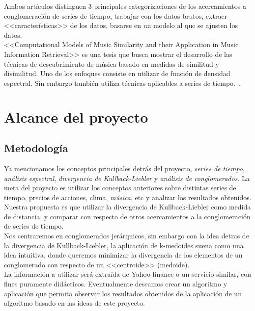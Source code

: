 \documentclass[12pt,oneside]{book}
\begin{document}
Ambos art\'iculos distinguen 3 principales categorizaciones de los acercamientos a conglomeraci\'on de series de tiempo, trabajar con los datos brutos, extraer <<caracter\'isticas>> de los datos, basarse en un modelo al que se ajusten los datos. \\

<<Computational Models of Music Similarity and their Application in Music Information Retrieval>> es una tesis que busca mostrar el desarrollo de las t\'ecnicas de descubrimiento de m\'usica basado en medidas de similitud y disimilitud. Uno de los enfoques consiste en utilizar de funci\'on de densidad espectral. Sin embargo tambi\'en utiliza t\'ecnicas aplicables a series de tiempo.~\cite{MUSIC}.
\chapter{Alcance del proyecto} %
\label{cha:alcance_del_proyecto}
\section{Metodolog\'ia} %
\label{sec:metodologia}
Ya mencionamos los conceptos principales detr\'as del proyecto, \emph{series de tiempo}, \emph{an\'alisis espectral}, \emph{divergencia de Kullback-Liebler} y \emph{an\'alisis de conglomerados}. La meta del proyecto es utilizar los conceptos anteriores sobre distintas series de tiempo, precios de acciones, clima, \emph{m\'usica}, etc y analizar los resultados obtenidos. \\

Nuestra propuesta es que utilizar la divergencia de Kullback-Liebler como medida de distancia, y comparar con respecto de otros acercamientos a la conglomeraci\'on de series de tiempo.\\

Nos centraremos en conglomerados jer\'arquicos, sin embargo con la idea detras de la divergencia de Kullback-Liebler, la aplicaci\'on de k-medoides suena como una idea intuitiva, donde queremos minimizar la divergencia de los elementos de un conglomerado con respecto de un <<centroide>> (medoide).\\

La informaci\'on a utilizar ser\'a extra\'ida de Yahoo finance o un servicio similar, con fines puramente did\'acticos. Eventualmente deseamos crear un algoritmo y aplicaci\'on que permita observar los resultados obtenidos de la aplicaci\'on de un algoritmo basado en las ideas de este proyecto. \\
\end{document}
